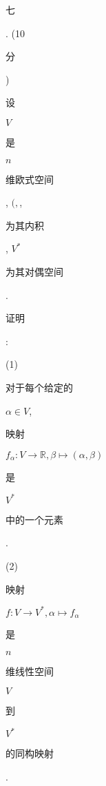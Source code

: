 \documentclass[10pt]{article}
\begin{document}
\begin{CJK}{UTF8}{mj}七\end{CJK}. (10 \begin{CJK}{UTF8}{mj}分\end{CJK}) \begin{CJK}{UTF8}{mj}设\end{CJK} $V$ \begin{CJK}{UTF8}{mj}是\end{CJK} $n$ \begin{CJK}{UTF8}{mj}维欧式空间\end{CJK}, $(,$, \begin{CJK}{UTF8}{mj}为其内积\end{CJK}, $V^{*}$ \begin{CJK}{UTF8}{mj}为其对偶空间\end{CJK}. \begin{CJK}{UTF8}{mj}证明\end{CJK}:

(1) \begin{CJK}{UTF8}{mj}对于每个给定的\end{CJK} $\alpha \in V$, \begin{CJK}{UTF8}{mj}映射\end{CJK} $f_{\alpha}: V \rightarrow \mathbb{R}, \beta \mapsto(\alpha, \beta)$ \begin{CJK}{UTF8}{mj}是\end{CJK} $V^{*}$ \begin{CJK}{UTF8}{mj}中的一个元素\end{CJK}.

(2) \begin{CJK}{UTF8}{mj}映射\end{CJK} $f: V \rightarrow V^{*}, \alpha \mapsto f_{\alpha}$ \begin{CJK}{UTF8}{mj}是\end{CJK} $n$ \begin{CJK}{UTF8}{mj}维线性空间\end{CJK} $V$ \begin{CJK}{UTF8}{mj}到\end{CJK} $V^{*}$ \begin{CJK}{UTF8}{mj}的同构映射\end{CJK}.
\end{document}
